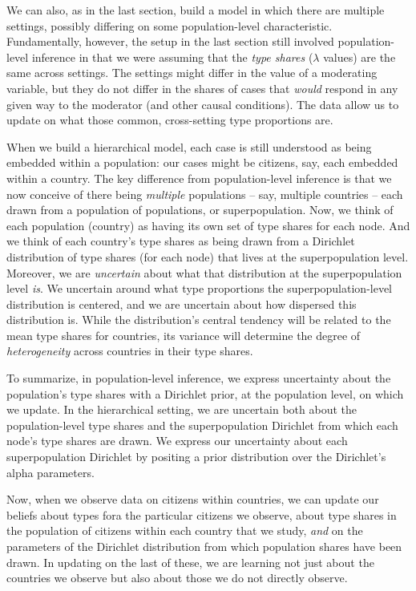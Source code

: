 \documentclass[
  12pt,
]{book}
\begin{document}
We can also, as in the last section, build a model in which there are multiple settings, possibly differing on some population-level characteristic. Fundamentally, however, the setup in the last section still involved population-level inference in that we were assuming that the \emph{type shares} (\(\lambda\) values) are the same across settings. The settings might differ in the value of a moderating variable, but they do not differ in the shares of cases that \emph{would} respond in any given way to the moderator (and other causal conditions). The data allow us to update on what those common, cross-setting type proportions are.

When we build a hierarchical model, each case is still understood as being embedded within a population: our cases might be citizens, say, each embedded within a country. The key difference from population-level inference is that we now conceive of there being \emph{multiple} populations -- say, multiple countries -- each drawn from a population of populations, or superpopulation. Now, we think of each population (country) as having its own set of type shares for each node. And we think of each country's type shares as being drawn from a Dirichlet distribution of type shares (for each node) that lives at the superpopulation level. Moreover, we are \emph{uncertain} about what that distribution at the superpopulation level \emph{is}. We uncertain around what type proportions the superpopulation-level distribution is centered, and we are uncertain about how dispersed this distribution is. While the distribution's central tendency will be related to the mean type shares for countries, its variance will determine the degree of \emph{heterogeneity} across countries in their type shares.

To summarize, in population-level inference, we express uncertainty about the population's type shares with a Dirichlet prior, at the population level, on which we update. In the hierarchical setting, we are uncertain both about the population-level type shares and the superpopulation Dirichlet from which each node's type shares are drawn. We express our uncertainty about each superpopulation Dirichlet by positing a prior distribution over the Dirichlet's alpha parameters.

Now, when we observe data on citizens within countries, we can update our beliefs about types fora the particular citizens we observe, about type shares in the population of citizens within each country that we study, \emph{and} on the parameters of the Dirichlet distribution from which population shares have been drawn. In updating on the last of these, we are learning not just about the countries we observe but also about those we do not directly observe.
\end{document}
